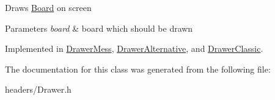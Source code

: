 Draws \hyperlink{classBoard}{Board} on screen 
\begin{DoxyParams}{Parameters}
{\em board} & board which should be drawn \\
\hline
\end{DoxyParams}


Implemented in \hyperlink{classDrawerMess_a6d682acdf4ad01f370f9985cacd606a9}{Drawer\+Mess}, \hyperlink{classDrawerAlternative_a2d56b61df9a3878c9aa24db5896578ba}{Drawer\+Alternative}, and \hyperlink{classDrawerClassic_ab5e18d90571afab9a2b8482b2d9d8264}{Drawer\+Classic}.



The documentation for this class was generated from the following file\+:\begin{DoxyCompactItemize}
\item 
headers/Drawer.\+h\end{DoxyCompactItemize}
